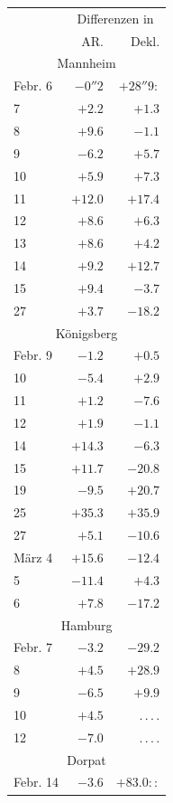 \begin{center}
\begin{tabular}{l|r|r}
& \multicolumn{2}{c}{Differenzen in} \\
& AR. & Dekl. \\
\multicolumn{3}{c}{Mannheim} \\
Febr. 6 & $-0''2$ & $+28''9\!:$ \\
7 & $+2.2$ & $+1.3$ \\
8 & $+9.6$ & $-1.1$ \\
9 & $-6.2$ & $+5.7$ \\
10 & $+5.9$ & $+7.3$ \\
11 & $+12.0$ & $+17.4$ \\
12 & $+8.6$ & $+6.3$ \\
13 & $+8.6$ & $+4.2$ \\
14 & $+9.2$ & $+12.7$ \\
15 & $+9.4$ & $-3.7$ \\
27 & $+3.7$ & $-18.2$ \\
\multicolumn{3}{c}{Königsberg} \\
Febr. 9 & $-1.2$ & $+0.5$ \\
10 & $-5.4$ & $+2.9$ \\
11 & $+1.2$ & $-7.6$ \\
12 & $+1.9$ & $-1.1$ \\
14 & $+14.3$ & $-6.3$ \\
15 & $+11.7$ & $-20.8$ \\
19 & $-9.5$ & $+20.7$ \\
25 & $+35.3$ & $+35.9$ \\
27 & $+5.1$ & $-10.6$ \\
März 4 & $+15.6$ & $-12.4$ \\
5 & $-11.4$ & $+4.3$ \\
6 & $+7.8$ & $-17.2$ \\
\multicolumn{3}{c}{Hamburg} \\
Febr. 7 & $-3.2$ & $-29.2$ \\
8 & $+4.5$ & $+28.9$ \\
9 & $-6.5$ & $+9.9$ \\
10 & $+4.5$ & \mbox{.\,.\,.\,.} \\
12 & $-7.0$ & \mbox{.\,.\,.\,.} \\
\multicolumn{3}{c}{Dorpat} \\
Febr. 14 & $-3.6$ & $+83.0\!::$ \\
\end{tabular}
\end{center}

